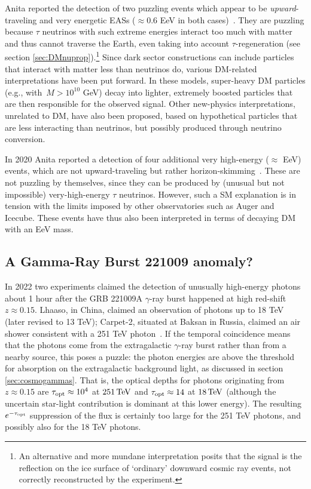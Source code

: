 \medskip

{\sc Anita} reported the detection of two puzzling events which appear to be {\it upward}-traveling and very energetic EASs ($\approx$0.6 EeV in both cases)~\cite{ANITAanomaly}. They are puzzling because $\tau$ neutrinos with such extreme energies interact too much with matter and thus cannot traverse the Earth, even taking into account $\tau$-regeneration (see section \ref{sec:DMnuprop}).\footnote{An alternative and more mundane interpretation posits that the signal is the reflection on the ice surface of `ordinary' downward cosmic ray events, not correctly reconstructed by the experiment.}
Since dark sector constructions can include particles that interact with matter less than neutrinos do, various DM-related interpretations have been put forward. In these models, super-heavy DM particles (e.g., with~$M > 10^{10}$ GeV) decay into lighter, extremely boosted particles that are then responsible for the observed signal. 
Other new-physics interpretations, unrelated to DM, have also been proposed, 
based on hypothetical particles that are less interacting than neutrinos, but possibly produced through neutrino conversion.


\medskip

In 2020 {\sc Anita} reported a detection of four additional very high-energy ($\approx$ EeV) events, which are not upward-traveling but rather horizon-skimming~\cite{ANITAanomaly2}. These are not puzzling by themselves, since they can be produced by (unusual but not impossible) very-high-energy $\tau$ neutrinos. However, such a SM explanation is in tension with the limits imposed by other observatories such as {\sc Auger} and {\sc Icecube}. These events have thus also been interpreted in terms of decaying DM with an EeV mass.



\subsection{A Gamma-Ray Burst 221009 anomaly?}\label{sec:GRBanomaly}
In 2022 two experiments claimed  
the detection of unusually high-energy photons about 1 hour after the
GRB 221009A $\gamma$-ray burst happened at high red-shift $z\approx 0.15$.
{\sc Lhaaso}, in China, claimed an observation of photons up to 18 TeV (later revised to 13 TeV);
{\sc Carpet-2}, situated at Baksan in Russia, claimed an air shower consistent with a 251 TeV photon~\cite{GRBanomaly}.
If the temporal coincidence means that the photons come from the extragalactic $\gamma$-ray burst
rather than from a nearby source, this poses a puzzle: the photon energies are above the threshold for absorption on the extragalactic background light, as discussed in section \ref{sec:cosmogammas}.
That is, the optical depths for  photons originating from $z\approx 0.15$ are $\tau_{\rm opt} \approx 10^4$ at $251\,{\rm TeV}$ and
$\tau_{\rm opt} \approx 14$ at $18\,{\rm TeV}$ (although the uncertain star-light contribution is dominant at this lower energy).
The resulting $e^{-\tau_{\rm opt}}$  suppression of the flux is certainly too large for the 251 TeV photons, and possibly also for the 18 TeV photons.

